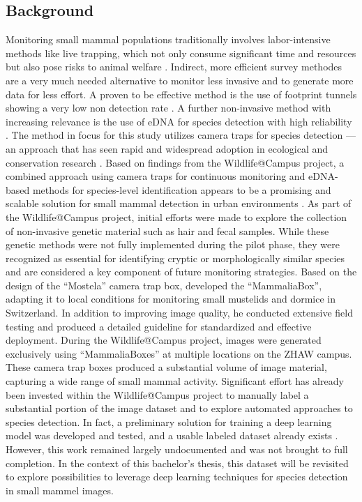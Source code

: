 \subsection{Background}
Monitoring small mammal populations traditionally involves labor-intensive methods like live trapping, which not only consume significant time and resources but also pose risks to animal welfare \autocite{grafWildlifeCampusKleineSaeugetiere2022}.
Indirect, more efficient survey methodes are a very much needed alternative to monitor less invasive and to generate more data for less effort.
A proven to be effective method is the use of footprint tunnels showing a very low non detection rate \autocite{yarnellUsingOccupancyAnalysis2014}.
A further non-invasive method with increasing relevance is the use of \ac{eDNA} for species detection with high reliability \autocite{thomsenEnvironmentalDNAEmerging2015}.
The method in focus for this study utilizes camera traps for species detection --- an approach that has seen rapid and widespread adoption in ecological and conservation research \autocite{delisleNextGenerationCameraTrapping2021}.
Based on findings from the Wildlife@Campus project, a combined approach using camera traps for continuous monitoring and \acs{eDNA}-based methods for species-level identification appears to be a promising and scalable solution for small mammal detection in urban environments \autocite{grafWildlifeCampusKleineSaeugetiere2022}.
As part of the Wildlife@Campus project, initial efforts were made to explore the collection of non-invasive genetic material such as hair and fecal samples.
While these genetic methods were not fully implemented during the pilot phase, they were recognized as essential for identifying cryptic or morphologically similar species and are considered a key component of future monitoring strategies.
Based on the design of the \enquote{Mostela} camera trap box, \textcite{aegerterMonitoringKleinmustelidenSchlaefern2019} developed the \enquote{MammaliaBox}, adapting it to local conditions for monitoring small mustelids and dormice in Switzerland.
In addition to improving image quality, he conducted extensive field testing and produced a detailed guideline for standardized and effective deployment.
During the Wildlife@Campus project, images were generated exclusively using \enquote{MammaliaBoxes} at multiple locations on the ZHAW campus. 
These camera trap boxes produced a substantial volume of image material, capturing a wide range of small mammal activity.
Significant effort has already been invested within the Wildlife@Campus project to manually label a substantial portion of the image dataset and to explore automated approaches to species detection.
In fact, a preliminary solution for training a deep learning model was developed and tested, and a usable labeled dataset already exists \autocite{ratnaweeraWildlifeCampusProgressReports2021}.
However, this work remained largely undocumented and was not brought to full completion. 
In the context of this bachelor's thesis, this dataset will be revisited to explore possibilities to leverage deep learning techniques for species detection in small mammel images.

